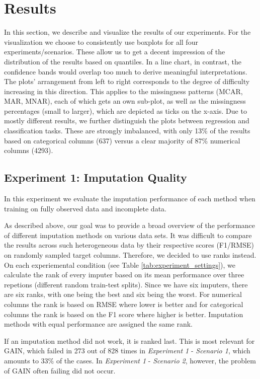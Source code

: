 \section{Results}
\label{sec:results}

In this section, we describe and visualize the results of our experiments. For the visualization we choose to consistently use boxplots for all four experiments/scenarios. These allow us to get a decent impression of the distribution of the results based on quantiles. In a line chart, in contrast, the confidence bands would overlap too much to derive meaningful interpretations. The plots' arrangement from left to right corresponds to the degree of difficulty increasing in this direction. This applies to the missingness patterns (MCAR, MAR, MNAR), each of which gets an own sub-plot, as well as the missingness percentages (small to larger), which are depicted as ticks on the x-axis. Due to mostly different results, we further distinguish the plots between regression and classification tasks. These are strongly imbalanced, with only 13\% of the results based on categorical columns (637) versus a clear majority of 87\% numerical columns (4293).


\subsection{Experiment 1: Imputation Quality}

In this experiment we evaluate the imputation performance of each method when training on fully observed data and incomplete data.

As described above, our goal was to provide a broad overview of the performance of different imputation methods on various data sets. It was difficult to compare the results across such heterogeneous data by their respective scores (F1/RMSE) on randomly sampled target columns. Therefore, we decided to use ranks instead. On each experiemental condition (see Table \ref{tab:experiment_settings}), we calculate the rank of every imputer based on its mean performance over three repetions (different random train-test splits). Since we have six imputers, there are six ranks, with one being the best and six being the worst. For numerical columns the rank is based on RMSE where lower is better and for categorical columns the rank is based on the F1 score where higher is better. Imputation methods with equal performance are assigned the same rank.

If an imputation method did not work, it is ranked last. This is most relevant for GAIN, which failed in 273 out of 828 times in \textit{Experiment 1} - \textit{Scenario 1}, which amounts to 33\% of the cases. In \textit{Experiment 1} - \textit{Scenario 2}, however, the problem of GAIN often failing did not occur.


